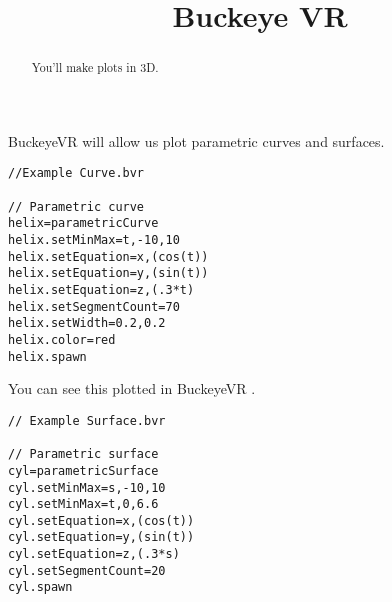 \documentclass{ximera}
\title{Buckeye VR}
\begin{document}
\begin{abstract}
  You'll make plots in 3D.
\end{abstract}
\maketitle

BuckeyeVR will allow us plot parametric curves and surfaces.

\begin{verbatim}
//Example Curve.bvr

// Parametric curve
helix=parametricCurve
helix.setMinMax=t,-10,10
helix.setEquation=x,(cos(t))
helix.setEquation=y,(sin(t))
helix.setEquation=z,(.3*t)
helix.setSegmentCount=70
helix.setWidth=0.2,0.2
helix.color=red
helix.spawn
\end{verbatim}

You can see this plotted in BuckeyeVR .

\begin{verbatim}
// Example Surface.bvr

// Parametric surface
cyl=parametricSurface
cyl.setMinMax=s,-10,10
cyl.setMinMax=t,0,6.6
cyl.setEquation=x,(cos(t))
cyl.setEquation=y,(sin(t))
cyl.setEquation=z,(.3*s)
cyl.setSegmentCount=20
cyl.spawn
\end{verbatim}
\end{document}
